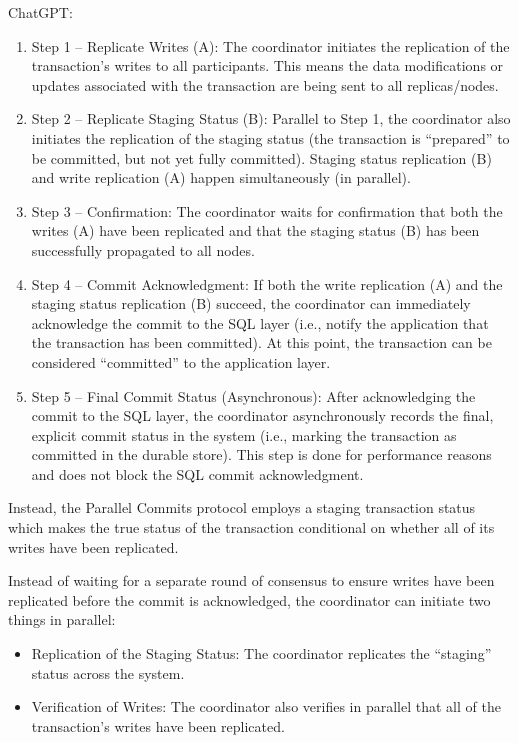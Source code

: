 \documentclass[11pt]{article}
\begin{document}
ChatGPT:
\begin{enumerate}
\item Step 1 – Replicate Writes (A):
The coordinator initiates the replication of the transaction's writes to all participants. This
means the data modifications or updates associated with the transaction are being sent to all
replicas/nodes.
\item Step 2 – Replicate Staging Status (B):
Parallel to Step 1, the coordinator also initiates the replication of the staging status (the
transaction is ``prepared'' to be committed, but not yet fully committed). Staging status replication
(B) and write replication (A) happen simultaneously (in parallel).
\item Step 3 – Confirmation:
The coordinator waits for confirmation that both the writes (A) have been replicated and that the
staging status (B) has been successfully propagated to all nodes.
\item Step 4 – Commit Acknowledgment:
If both the write replication (A) and the staging status replication (B) succeed, the coordinator
can immediately acknowledge the commit to the SQL layer (i.e., notify the application that the
transaction has been committed). At this point, the transaction can be considered ``committed'' to
the application layer.
\item Step 5 – Final Commit Status (Asynchronous):
After acknowledging the commit to the SQL layer, the coordinator asynchronously records the final,
explicit commit status in the system (i.e., marking the transaction as committed in the durable
store). This step is done for performance reasons and does not block the SQL commit acknowledgment.
\end{enumerate}


Instead, the Parallel Commits protocol employs a staging transaction status which
makes the true status of the transaction conditional on whether all of its writes have been
replicated.

Instead of waiting for a separate round of consensus to ensure writes have been replicated before the
commit is acknowledged, the coordinator can initiate two things in parallel:
\begin{itemize}
\item Replication of the Staging Status: The coordinator replicates the ``staging'' status across the system.
\item Verification of Writes: The coordinator also verifies in parallel that all of the transaction's
writes have been replicated.
\end{itemize}
\end{document}
